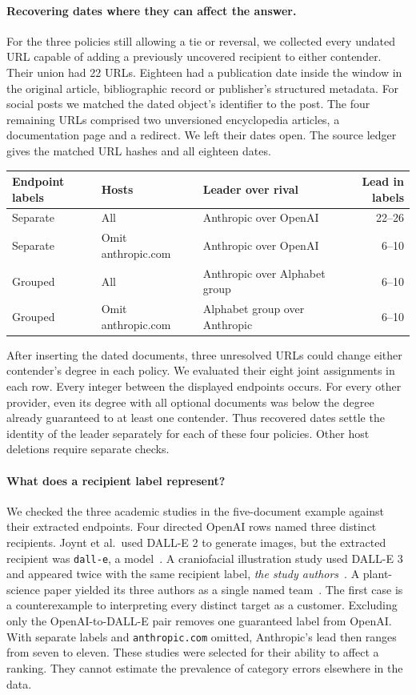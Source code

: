 \paragraph{Recovering dates where they can affect the answer.}
For the three policies still allowing a tie or reversal, we collected every undated URL capable of adding a previously uncovered recipient to either contender. Their union had 22 URLs. Eighteen had a publication date inside the window in the original article, bibliographic record or publisher's structured metadata. For social posts we matched the dated object's identifier to the post. The four remaining URLs comprised two unversioned encyclopedia articles, a documentation page and a redirect. We left their dates open. The source ledger gives the matched URL hashes and all eighteen dates.

\begin{center}\small
\begin{tabular}{lllr}
\toprule
Endpoint labels & Hosts & Leader over rival & Lead in labels\\
\midrule
Separate & All & Anthropic over OpenAI & 22--26\\
Separate & Omit anthropic.com & Anthropic over OpenAI & 6--10\\
Grouped & All & Anthropic over Alphabet group & 6--10\\
Grouped & Omit anthropic.com & Alphabet group over Anthropic & 6--10\\
\bottomrule
\end{tabular}
\end{center}
After inserting the dated documents, three unresolved URLs could change either contender's degree in each policy. We evaluated their eight joint assignments in each row. Every integer between the displayed endpoints occurs. For every other provider, even its degree with all optional documents was below the degree already guaranteed to at least one contender. Thus recovered dates settle the identity of the leader separately for each of these four policies. Other host deletions require separate checks.

\paragraph{What does a recipient label represent?}
We checked the three academic studies in the five-document example against their extracted endpoints. Four directed OpenAI rows named three distinct recipients. Joynt et al.\ used DALL-E 2 to generate images, but the extracted recipient was \texttt{dall-e}, a model~\cite{joynt}. A craniofacial illustration study used DALL-E 3 and appeared twice with the same recipient label, \emph{the study authors}~\cite{cranio}. A plant-science paper yielded its three authors as a single named team~\cite{plants}. The first case is a counterexample to interpreting every distinct target as a customer. Excluding only the OpenAI-to-DALL-E pair removes one guaranteed label from OpenAI. With separate labels and \texttt{anthropic.com} omitted, Anthropic's lead then ranges from seven to eleven. These studies were selected for their ability to affect a ranking. They cannot estimate the prevalence of category errors elsewhere in the data.

